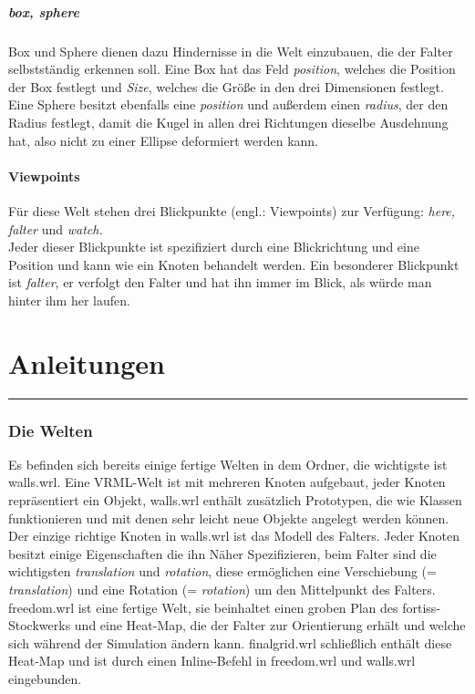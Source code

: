 \documentclass[titlepage, a4paper, ngerman]{article}
\begin{document}
\subsubsection{box, sphere} 
Box und Sphere dienen dazu Hindernisse in die Welt einzubauen, die der Falter selbstständig erkennen soll. Eine Box hat das Feld {\em position}, welches die Position der Box festlegt und {\em Size}, welches die Größe in den drei Dimensionen festlegt. \\
Eine Sphere besitzt ebenfalls eine {\em position} und außerdem einen {\em radius}, der den Radius festlegt, damit die Kugel in allen drei Richtungen dieselbe Ausdehnung hat, also nicht zu einer Ellipse deformiert werden kann.

\subsection{Viewpoints}
Für diese Welt stehen drei Blickpunkte (engl.: Viewpoints) zur Verfügung:
{\em here, falter} und {\em watch.}\\
Jeder dieser Blickpunkte ist spezifiziert durch eine Blickrichtung und eine Position und kann wie ein Knoten behandelt werden. Ein besonderer Blickpunkt ist {\em falter}, er verfolgt den Falter und hat ihn immer im Blick, als würde man hinter ihm her laufen.
%
%
\newpage
\part{Anleitungen}
\rule{\linewidth}{0.5mm}
\setcounter{section}{0}
\section{Die Welten}
Es befinden sich bereits einige fertige Welten in dem Ordner, die wichtigste ist walls.wrl. Eine VRML-Welt ist mit mehreren Knoten aufgebaut, jeder Knoten repräsentiert ein Objekt, walls.wrl enthält zusätzlich Prototypen, die wie Klassen funktionieren und mit denen sehr leicht neue Objekte angelegt werden können. Der einzige richtige Knoten in walls.wrl ist das Modell des Falters. Jeder Knoten besitzt einige Eigenschaften die ihn Näher Spezifizieren, beim Falter sind die wichtigsten {\em translation} und {\em rotation}, diese ermöglichen eine Verschiebung (= {\em translation}) und eine Rotation (= {\em rotation}) um den Mittelpunkt des Falters. \\
freedom.wrl ist eine fertige Welt, sie beinhaltet einen groben Plan des fortiss-Stockwerks und eine Heat-Map, die der Falter zur Orientierung erhält und welche sich während der Simulation ändern kann. finalgrid.wrl schließlich enthält diese Heat-Map und ist durch einen Inline-Befehl in freedom.wrl und walls.wrl eingebunden.
\end{document}
